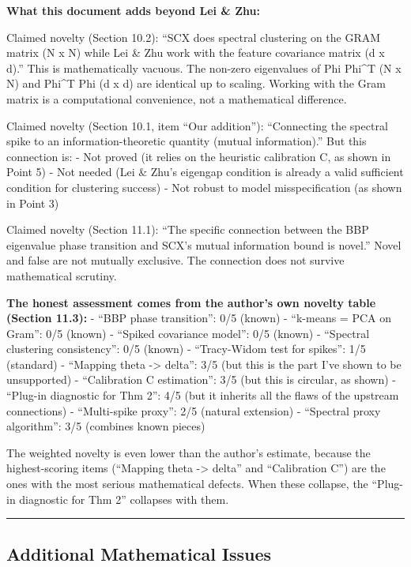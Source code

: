 \documentclass[
  12pt,
]{article}
\begin{document}
\textbf{What this document adds beyond Lei \& Zhu:}

Claimed novelty (Section 10.2): ``SCX does spectral clustering on the
GRAM matrix (N x N) while Lei \& Zhu work with the feature covariance
matrix (d x d).'' This is mathematically vacuous. The non-zero
eigenvalues of Phi Phi\^{}T (N x N) and Phi\^{}T Phi (d x d) are
identical up to scaling. Working with the Gram matrix is a computational
convenience, not a mathematical difference.

Claimed novelty (Section 10.1, item ``Our addition''): ``Connecting the
spectral spike to an information-theoretic quantity (mutual
information).'' But this connection is: - Not proved (it relies on the
heuristic calibration C, as shown in Point 5) - Not needed (Lei \& Zhu's
eigengap condition is already a valid sufficient condition for
clustering success) - Not robust to model misspecification (as shown in
Point 3)

Claimed novelty (Section 11.1): ``The specific connection between the
BBP eigenvalue phase transition and SCX's mutual information bound is
novel.'' Novel and false are not mutually exclusive. The connection does
not survive mathematical scrutiny.

\textbf{The honest assessment comes from the author's own novelty table
(Section 11.3):} - ``BBP phase transition'': 0/5 (known) - ``k-means =
PCA on Gram'': 0/5 (known) - ``Spiked covariance model'': 0/5 (known) -
``Spectral clustering consistency'': 0/5 (known) - ``Tracy-Widom test
for spikes'': 1/5 (standard) - ``Mapping theta -\textgreater{} delta'':
3/5 (but this is the part I've shown to be unsupported) - ``Calibration
C estimation'': 3/5 (but this is circular, as shown) - ``Plug-in
diagnostic for Thm 2'': 4/5 (but it inherits all the flaws of the
upstream connections) - ``Multi-spike proxy'': 2/5 (natural extension) -
``Spectral proxy algorithm'': 3/5 (combines known pieces)

The weighted novelty is even lower than the author's estimate, because
the highest-scoring items (``Mapping theta -\textgreater{} delta'' and
``Calibration C'') are the ones with the most serious mathematical
defects. When these collapse, the ``Plug-in diagnostic for Thm 2''
collapses with them.

\begin{center}\rule{0.5\linewidth}{0.5pt}\end{center}

\subsection{Additional Mathematical
Issues}\label{additional-mathematical-issues}
\end{document}
